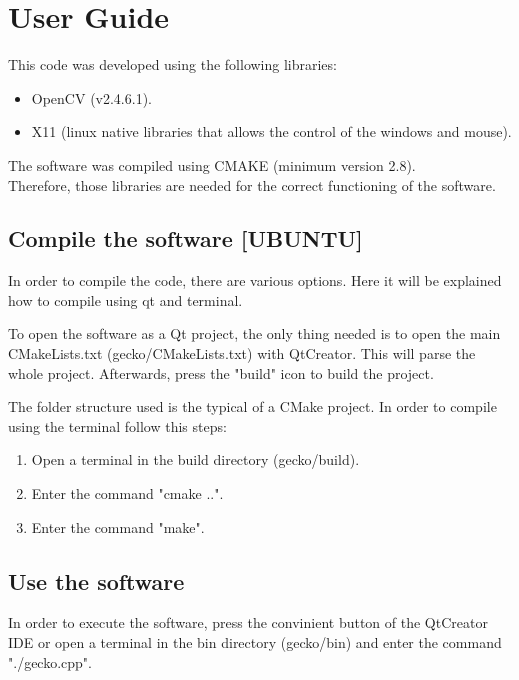 \documentclass{article}
\begin{document}
\section{User Guide}
This code was developed using the following libraries: 
\begin{itemize}
\item OpenCV (v2.4.6.1).
\item X11 (linux native libraries that allows the control of the windows and mouse). 
\end{itemize}
The software was compiled using CMAKE (minimum version 2.8).
\\[0.5cm]
Therefore, those libraries are needed for the correct functioning of the software. 


\subsection{Compile the software [UBUNTU]}

In order to compile the code, there are various options. Here it will be explained how to compile using qt and terminal. 

To open the software as a Qt project, the only thing needed is to open the main CMakeLists.txt (gecko/CMakeLists.txt) with QtCreator. This will parse the whole project. 
Afterwards, press the "build" icon to build the project. 


The folder structure used is the typical of a CMake project. In order to compile using the terminal follow this steps: 
\begin{enumerate}
 \item Open a terminal in the build directory (gecko/build). 
 \item Enter the command "cmake ..". 
 \item Enter the command "make". 
\end{enumerate}

\subsection{Use the software}
In order to execute the software, press the convinient button of the QtCreator IDE or open a terminal in the bin directory (gecko/bin) and enter the command "./gecko.cpp". 
\end{document}
